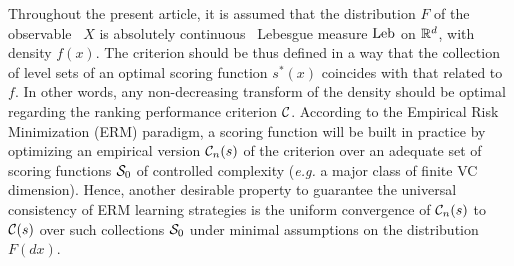 Throughout the present article, it is assumed that the distribution $F$ of the observable \rv~$X$ is absolutely continuous \wrt~Lebesgue measure $\leb$ on
$\rset^d$, with density $f(x)$.  The criterion should be thus defined in a way that the collection of level sets of an optimal scoring function $s^*(x)$ coincides with that related to $f$.  In other words, any non-decreasing transform of the density should be optimal regarding the ranking performance criterion $\crit$. According to the Empirical Risk Minimization (ERM) paradigm, a scoring function will be built in practice by optimizing an empirical version $\crit_n(s)$ of the
criterion over an adequate set of scoring functions $\S_0$ of controlled complexity (\textit{e.g.} a major class of finite {\sc VC} dimension). Hence, another desirable property to guarantee the universal consistency of ERM learning strategies is the uniform convergence of
$\crit_n(s)$ to $\crit(s)$  over such collections $\S_0$ under minimal assumptions on the distribution $F(dx)$.

